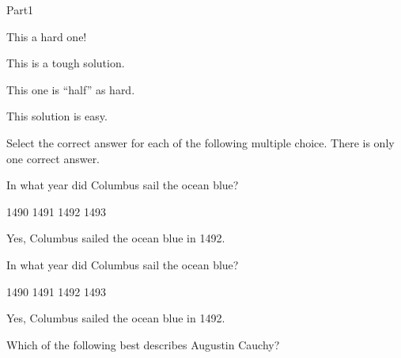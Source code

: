 \documentclass{article}
\begin{document}
\begin{exam}[Part I.]{Part1}
\begin{problem*}[\auto]
\begin{parts}

\item {} This a hard one!

\begin{solution}[1in]
This is a tough solution.
\end{solution}

\item {} This one is ``half'' as hard.

\begin{solution}[1in]
This solution is easy.
\end{solution}

\end{parts}
\end{problem*}

\begin{problem*}[\auto]
Select the correct answer for each of the following multiple
choice. There is only one correct answer.
\begin{parts}
    \item{} In what year did Columbus sail the ocean blue?
    \begin{answers}{6} %
    \bChoices
         1490\eAns
         1491\eAns
         1492\eAns
         1493\eAns
    \eChoices
    \end{answers}
\begin{solution}
    Yes, Columbus sailed the ocean blue in 1492.
\end{solution}

    \item{} In what year did Columbus sail the ocean blue?
    \begin{answers}{1} %
    \bChoices
         1490\eAns
         1491\eAns
         1492\eAns
         1493\eAns
    \eChoices
    \end{answers}
\begin{solution}
    Yes, Columbus sailed the ocean blue in 1492.
\end{solution}

\end{parts}
\end{problem*}


\begin{problem}[5]
Which of the following best describes Augustin Cauchy?

\sqForms %


\end{problem}
\end{exam}
\end{document}
